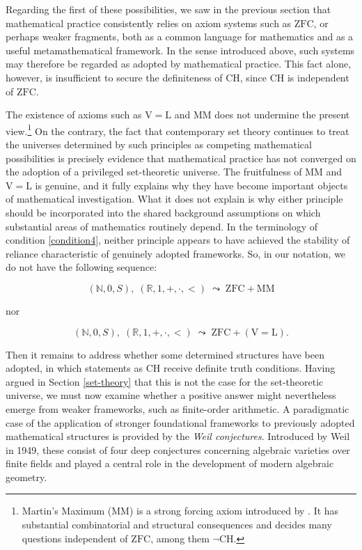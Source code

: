 \documentclass[11pt,a4paper]{book}
\theoremstyle{plain}
\begin{document}
Regarding the first of these possibilities, we saw in the previous section that mathematical practice consistently relies on axiom systems such as $\mathrm{ZFC}$, or perhaps weaker fragments, both as a common language for mathematics and as a useful metamathematical framework. In the sense introduced above, such systems may therefore be regarded as adopted by mathematical practice. This fact alone, however, is insufficient to secure the definiteness of $\mathrm{CH}$, since $\mathrm{CH}$ is independent of $\mathrm{ZFC}$.

The existence of axioms such as $\mathrm{V=L}$ and $\mathrm{MM}$ does not undermine the present view.\footnote{Martin's Maximum (MM) is a strong forcing axiom introduced by \textcite{ForemanMagidorShelah1988}. It has substantial combinatorial and structural consequences and decides many questions independent of $\mathrm{ZFC}$, among them $\neg\mathrm{CH}$.} On the contrary, the fact that contemporary set theory continues to treat the universes determined by such principles as competing mathematical possibilities is precisely evidence that mathematical practice has not converged on the adoption of a privileged set-theoretic universe. The fruitfulness of $\mathrm{MM}$ and $\mathrm{V=L}$ is genuine, and it fully explains why they have become important objects of mathematical investigation. What it does not explain is why either principle should be incorporated into the shared background assumptions on which substantial areas of mathematics routinely depend. In the terminology of condition \ref{condition4}, neither principle appears to have achieved the stability of reliance characteristic of genuinely adopted frameworks. So, in our notation, we do not have the following sequence:

$$ (\mathbb{N}, 0, S), \; (\mathbb{R},1, +, \cdot, <) \; \leadsto \; \mathrm{ZFC}+\mathrm{MM} $$

nor 

$$ (\mathbb{N}, 0, S), \; (\mathbb{R},1, +, \cdot, <) \; \leadsto \; \mathrm{ZFC}+\mathrm{(V=L)}. $$

Then it remains to address whether some determined structures have been adopted, in which statements as $\mathrm{CH}$ receive definite truth conditions. Having argued in Section \ref{set-theory} that this is not the case for the set-theoretic universe, we must now examine whether a positive answer might nevertheless emerge from weaker frameworks, such as finite-order arithmetic.
A paradigmatic case of the application of stronger foundational frameworks to previously adopted mathematical structures is provided by the \textit{Weil conjectures}. Introduced by Weil in 1949, these consist of four deep conjectures concerning algebraic varieties over finite fields and played a central role in the development of modern algebraic geometry.
\end{document}
